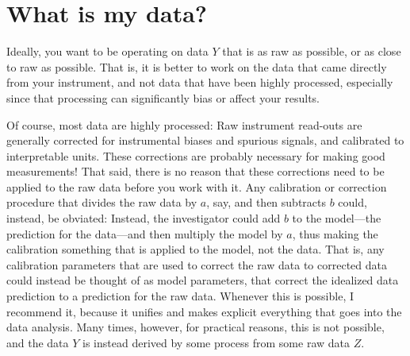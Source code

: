 \documentclass{article}
\begin{document}
\section{What is my data?}\label{sec:data}
Ideally, you want to be operating on data $Y$ that is as raw as possible, or as close to raw as possible.
That is, it is better to work on the data that came directly from your instrument, and not data that have been highly processed, especially since that processing can significantly bias or affect your results.

Of course, most data are highly processed: Raw instrument read-outs are generally corrected for instrumental biases and spurious signals, and calibrated to interpretable units.
These corrections are probably necessary for making good measurements!
That said, there is no reason that these corrections need to be applied to the raw data before you work with it.
Any calibration or correction procedure that divides the raw data by $a$, say, and then subtracts $b$ could, instead, be obviated:
Instead, the investigator could add $b$ to the model---the prediction for the data---and then multiply the model by $a$, thus making the calibration something that is applied to the model, not the data.
That is, any calibration parameters that are used to correct the raw data to corrected data could instead be thought of as model parameters, that correct the idealized data prediction to a prediction for the raw data.
Whenever this is possible, I recommend it, because it unifies and makes explicit everything that goes into the data analysis.
Many times, however, for practical reasons, this is not possible, and the data $Y$ is instead derived by some process from some raw data $Z$.
\end{document}
